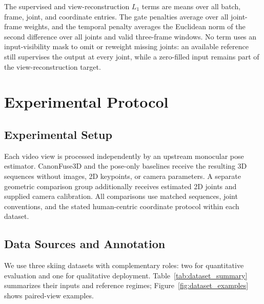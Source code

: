 \documentclass[preprint,12pt]{elsarticle}
\begin{document}
The supervised and view-reconstruction \(L_1\) terms are means over all batch, frame, joint, and coordinate entries. The gate penalties average over all joint-frame weights, and the temporal penalty averages the Euclidean norm of the second difference over all joints and valid three-frame windows. No term uses an input-visibility mask to omit or reweight missing joints: an available reference still supervises the output at every joint, while a zero-filled input remains part of the view-reconstruction target. 

\section{Experimental Protocol}

\subsection{Experimental Setup}

Each video view is processed independently by an upstream monocular pose estimator. CanonFuse3D and the pose-only baselines receive the resulting 3D sequences without images, 2D keypoints, or camera parameters. A separate geometric comparison group additionally receives estimated 2D joints and supplied camera calibration. All comparisons use matched sequences, joint conventions, and the stated human-centric coordinate protocol within each dataset.

\subsection{Data Sources and Annotation}
\label{subsec:dataset_annotation}

We use three skiing datasets with complementary roles: two for quantitative evaluation and one for qualitative deployment. Table~\ref{tab:dataset_summary} summarizes their inputs and reference regimes; Figure~\ref{fig:dataset_examples} shows paired-view examples.
\end{document}
